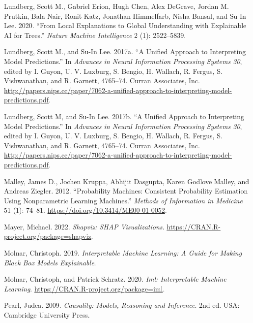 \begin{CSLReferences}{1}{0}
\leavevmode{}%
Lundberg, Scott M., Gabriel Erion, Hugh Chen, Alex DeGrave, Jordan M. Prutkin, Bala Nair, Ronit Katz, Jonathan Himmelfarb, Nisha Bansal, and Su-In Lee. 2020. {``From Local Explanations to Global Understanding with Explainable AI for Trees.''} \emph{Nature Machine Intelligence} 2 (1): 2522--5839.

\leavevmode{}%
Lundberg, Scott M., and Su-In Lee. 2017a. {``A Unified Approach to Interpreting Model Predictions.''} In \emph{Advances in Neural Information Processing Systems 30}, edited by I. Guyon, U. V. Luxburg, S. Bengio, H. Wallach, R. Fergus, S. Vishwanathan, and R. Garnett, 4765--74. Curran Associates, Inc. \url{http://papers.nips.cc/paper/7062-a-unified-approach-to-interpreting-model-predictions.pdf}.

\leavevmode{}%
Lundberg, Scott M, and Su-In Lee. 2017b. {``A Unified Approach to Interpreting Model Predictions.''} In \emph{Advances in Neural Information Processing Systems 30}, edited by I. Guyon, U. V. Luxburg, S. Bengio, H. Wallach, R. Fergus, S. Vishwanathan, and R. Garnett, 4765--74. Curran Associates, Inc. \url{http://papers.nips.cc/paper/7062-a-unified-approach-to-interpreting-model-predictions.pdf}.

\leavevmode{}%
Malley, James D., Jochen Kruppa, Abhijit Dasgupta, Karen Godlove Malley, and Andreas Ziegler. 2012. {``Probability Machines: Consistent Probability Estimation Using Nonparametric Learning Machines.''} \emph{Methods of Information in Medicine} 51 (1): 74--81. \url{https://doi.org/10.3414/ME00-01-0052}.

\leavevmode{}%
Mayer, Michael. 2022. \emph{Shapviz: SHAP Visualizations}. \url{https://CRAN.R-project.org/package=shapviz}.

\leavevmode{}%
Molnar, Christoph. 2019. \emph{Interpretable Machine Learning: A Guide for Making Black Box Models Explainable}.

\leavevmode{}%
Molnar, Christoph, and Patrick Schratz. 2020. \emph{Iml: Interpretable Machine Learning}. \url{https://CRAN.R-project.org/package=iml}.

\leavevmode{}%
Pearl, Judea. 2009. \emph{Causality: Models, Reasoning and Inference}. 2nd ed. USA: Cambridge University Press.


\end{CSLReferences}
